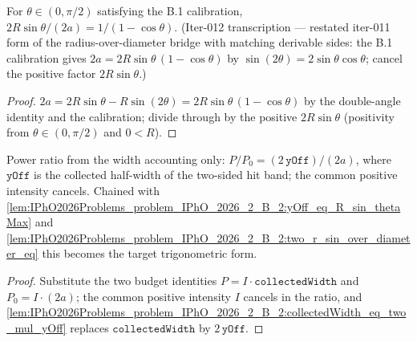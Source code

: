 \begin{lemma}
\label{lem:IPhO2026Problems_problem_IPhO_2026_2_B_2:two_r_sin_over_diameter_eq}
For $\theta \in (0, \pi/2)$ satisfying the B.1 calibration,
$2R\sin\theta/(2a) = 1/(1-\cos\theta)$.  (Iter-012 transcription ---
restated iter-011 form of the radius-over-diameter bridge with matching
derivable sides: the B.1 calibration gives
$2a = 2R\sin\theta\,(1-\cos\theta)$ by
$\sin(2\theta) = 2\sin\theta\cos\theta$; cancel the positive factor
$2R\sin\theta$.)
\end{lemma}
\begin{proof}
$2a = 2R\sin\theta - R\sin(2\theta)
= 2R\sin\theta\,(1-\cos\theta)$ by the double-angle identity and the
calibration; divide through by the positive $2R\sin\theta$ (positivity
from $\theta \in (0, \pi/2)$ and $0 < R$).
\end{proof}

\begin{lemma}
\label{lem:IPhO2026Problems_problem_IPhO_2026_2_B_2:power_ratio_eq_width_ratio}
Power ratio from the width accounting only:
$P / P_0 = (2\,\texttt{yOff}) / (2a)$, where $\texttt{yOff}$ is the
collected half-width of the two-sided hit band; the common positive
intensity cancels.  Chained with
\cref{lem:IPhO2026Problems_problem_IPhO_2026_2_B_2:yOff_eq_R_sin_thetaMax}
and
\cref{lem:IPhO2026Problems_problem_IPhO_2026_2_B_2:two_r_sin_over_diameter_eq}
this becomes the target trigonometric form.
\end{lemma}
\begin{proof}
Substitute the two budget identities
$P = I \cdot \texttt{collectedWidth}$ and $P_0 = I \cdot (2a)$; the
common positive intensity $I$ cancels in the ratio, and
\cref{lem:IPhO2026Problems_problem_IPhO_2026_2_B_2:collectedWidth_eq_two_mul_yOff}
replaces $\texttt{collectedWidth}$ by $2\,\texttt{yOff}$.
\end{proof}

